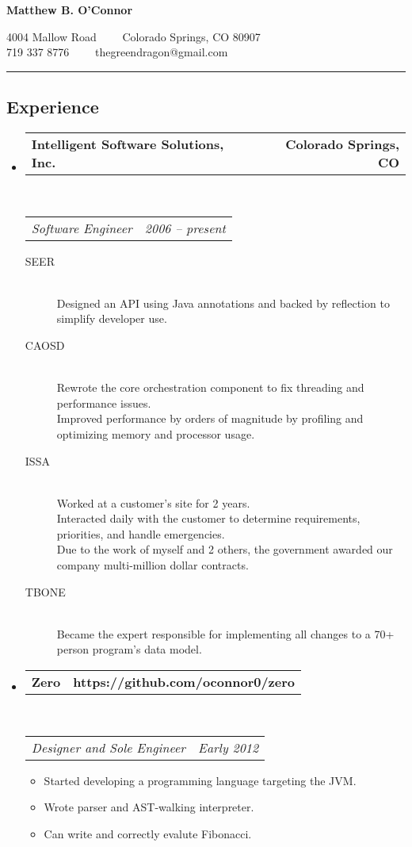 \documentclass[10pt,letterpaper]{article}
\makeatletter
\newcommand{\headerrow}[2]
{\begin{tabular*}{\linewidth}{l@{\extracolsep{\fill}}r}
	#1 &
	#2 \\
\end{tabular*}}
\makeatother
\begin{document}
\begin{center}
{\LARGE \textbf{Matthew B. O'Connor}}

4004 Mallow Road\ \ \textbullet
\ \ Colorado Springs, CO 80907
\\
719 337 8776\ \ \textbullet
\ \ thegreendragon@gmail.com
\end{center}

\hrule
\vspace{-0.4em}
\subsection*{Experience}

\begin{itemize}
	\parskip=0.1em

	\item
	\headerrow
		{\textbf{Intelligent Software Solutions, Inc.}}
		{\textbf{Colorado Springs, CO}}
	\\
	\headerrow
		{\emph{Software Engineer}}
		{\emph{2006 -- present}}
	\begin{description}
		\item[SEER] \hfill \\
				Designed an API using Java annotations and backed by reflection to simplify developer use.
		\item[CAOSD] \hfill \\
				Rewrote the core orchestration component to fix threading and performance issues. \\
				Improved performance by orders of magnitude by profiling and optimizing memory and processor usage.
		\item[ISSA] \hfill \\
				Worked at a customer's site for 2  years. \\
				Interacted daily with the customer to determine requirements, priorities, and handle emergencies. \\
				Due to the work of myself and 2 others, the government awarded our company multi-million dollar contracts.
		\item[TBONE] \hfill \\
				Became the expert responsible for implementing all changes to a 70+ person program's data model.
	\end{description}

	\item
	\headerrow
		{\textbf{Zero}}
		{\textbf{https://github.com/oconnor0/zero}}
	\\
	\headerrow
		{\emph{Designer and Sole Engineer}}
		{\emph{Early 2012}}
	\begin{itemize}
		\item Started developing a programming language targeting the JVM.
		\item Wrote parser and AST-walking interpreter.
		\item Can write and correctly evalute Fibonacci.
	\end{itemize}


\end{itemize}
\end{document}
